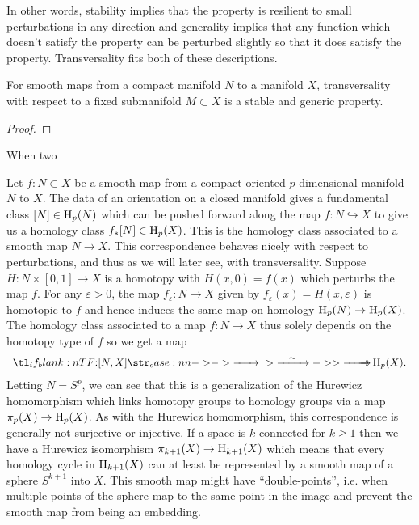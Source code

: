 In other words, stability implies that the property is resilient to small perturbations in any direction and generality implies that any function which doesn't satisfy the property can be perturbed slightly so that it does satisfy the property. Transversality fits both of these descriptions.

\begin{theorem}
	For smooth maps from a compact manifold $N$ to a manifold $X$, transversality with respect to a fixed submanifold $M\subset X$ is a stable and generic property.
\end{theorem}

\begin{proof}
\end{proof}

When two

\begin{definition}

\end{definition}

Let $f : N\subset X$ be a smooth map from a compact oriented $p$-dimensional manifold $N$ to $X$. The data of an orientation on a closed manifold gives a fundamental class $[N]\in \operatorname{H}_p(N)$ which can be pushed forward along the map $f : N \hookrightarrow X$ to give us a homology class $f_* [N]\in \operatorname{H}_p(X)$. This is the homology class associated to a smooth map $N\to X$.
This correspondence behaves nicely with respect to perturbations, and thus as we will later see, with transversality.
Suppose $H : N\times [0,1] \to X$ is a homotopy with $H(x,0)=f(x)$ which perturbs the map $f$. For any $\varepsilon>0$, the map $f_\varepsilon : N \to X$ given by $f_\varepsilon(x)=H(x,\varepsilon)$ is homotopic to $f$ and hence induces the same map on homology $\operatorname{H}_p(N)\to \operatorname{H}_p(X)$. The homology class associated to a map $f : N \to X$ thus solely depends on the homotopy type of $f$ so we get a map
\[
	\lkxfunc{}{[N,X]}{\H_p(X).}
\]
Letting $N=S^p$, we can see that this is a generalization of the Hurewicz homomorphism which links homotopy groups to homology groups via a map $\pi_p(X) \to \operatorname{H}_p(X)$.
As with the Hurewicz homomorphism, this correspondence is generally not surjective or injective. If a space is $k$-connected for $k\geq 1$ then we have a Hurewicz isomorphism $\pi_{k+1}(X) \to \operatorname{H}_{k+1}(X)$ which means that every homology cycle in $\operatorname{H}_{k+1}(X)$ can at least be represented by a smooth map of a sphere $S^{k+1}$ into $X$. This smooth map might have ``double-points'', i.e. when multiple points of the sphere map to the same point in the image and prevent the smooth map from being an embedding.

